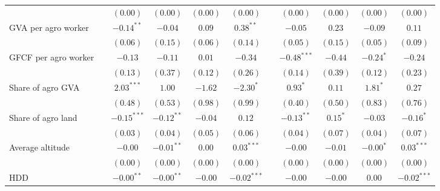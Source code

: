 \begin{table}
\begin{center}
\begin{tabular}{l c c c c c c c c c c}
                                  &               & $(0.00)$      & $(0.00)$      & $(0.00)$     & $(0.00)$      &               & $(0.00)$      & $(0.00)$      & $(0.00)$     & $(0.00)$      \\
GVA per agro worker               &               & $-0.14^{**}$  & $-0.04$       & $0.09$       & $0.38^{**}$   &               & $-0.05$       & $0.23$        & $-0.09$      & $0.11$        \\
                                  &               & $(0.06)$      & $(0.15)$      & $(0.06)$     & $(0.14)$      &               & $(0.05)$      & $(0.15)$      & $(0.05)$     & $(0.09)$      \\
GFCF per agro worker              &               & $-0.13$       & $-0.11$       & $0.01$       & $-0.34$       &               & $-0.48^{***}$ & $-0.44$       & $-0.24^{*}$  & $-0.24$       \\
                                  &               & $(0.13)$      & $(0.37)$      & $(0.12)$     & $(0.26)$      &               & $(0.14)$      & $(0.39)$      & $(0.12)$     & $(0.23)$      \\
Share of agro GVA                 &               & $2.03^{***}$  & $1.00$        & $-1.62$      & $-2.30^{*}$   &               & $0.93^{*}$    & $0.11$        & $1.81^{*}$   & $0.27$        \\
                                  &               & $(0.48)$      & $(0.53)$      & $(0.98)$     & $(0.99)$      &               & $(0.40)$      & $(0.50)$      & $(0.83)$     & $(0.76)$      \\
Share of agro land                &               & $-0.15^{***}$ & $-0.12^{**}$  & $-0.04$      & $0.12$        &               & $-0.13^{**}$  & $0.15^{*}$    & $-0.03$      & $-0.16^{*}$   \\
                                  &               & $(0.03)$      & $(0.04)$      & $(0.05)$     & $(0.06)$      &               & $(0.04)$      & $(0.07)$      & $(0.04)$     & $(0.07)$      \\
Average altitude                  &               & $-0.00$       & $-0.01^{**}$  & $0.00$       & $0.03^{***}$  &               & $-0.00$       & $-0.01$       & $-0.00^{*}$  & $0.03^{***}$  \\
                                  &               & $(0.00)$      & $(0.00)$      & $(0.00)$     & $(0.00)$      &               & $(0.00)$      & $(0.00)$      & $(0.00)$     & $(0.00)$      \\
HDD                               &               & $-0.00^{**}$  & $-0.00^{**}$  & $-0.00$      & $-0.02^{***}$ &               & $-0.00$       & $-0.00$       & $0.00$       & $-0.02^{***}$ \\

\end{tabular}
\end{center}
\end{table}
